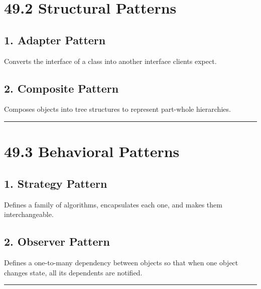 \hypertarget{structural-patterns}{%
\section{49.2 Structural Patterns}\label{structural-patterns}}

\hypertarget{adapter-pattern}{%
\subsection{1. Adapter Pattern}\label{adapter-pattern}}

Converts the interface of a class into another interface clients expect.

\hypertarget{composite-pattern}{%
\subsection{2. Composite Pattern}\label{composite-pattern}}

Composes objects into tree structures to represent part-whole
hierarchies.

\begin{center}\rule{0.5\linewidth}{0.5pt}\end{center}

\hypertarget{behavioral-patterns}{%
\section{49.3 Behavioral Patterns}\label{behavioral-patterns}}

\hypertarget{strategy-pattern}{%
\subsection{1. Strategy Pattern}\label{strategy-pattern}}

Defines a family of algorithms, encapsulates each one, and makes them
interchangeable.

\hypertarget{observer-pattern}{%
\subsection{2. Observer Pattern}\label{observer-pattern}}

Defines a one-to-many dependency between objects so that when one object
changes state, all its dependents are notified.

\begin{center}\rule{0.5\linewidth}{0.5pt}\end{center}

